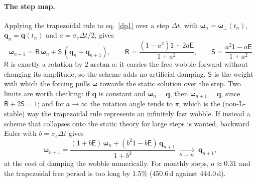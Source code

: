 \documentclass[11pt,a4paper]{article}
\newcommand{\bw}{\bm{\omega}}
\newcommand{\bq}{\mathbf{q}}
\newcommand{\E}{\mathsf{E}}
\newcommand{\Id}{\mathsf{1}}
\newcommand{\R}{\mathsf{R}}
\newcommand{\Sm}{\mathsf{S}}
\begin{document}
\paragraph{The step map.} Applying the trapezoidal rule to eq.~\eqref{dp1} over a step $\Delta t$,
with $\bw_n=\bw_\perp(t_n)$, $\bq_n=\bq(t_n)$ and $a=\sigma_e\Delta t/2$, gives
\begin{equation}
  \boxed{\;\bw_{n+1}=\R\,\bw_n+\Sm\,(\bq_n+\bq_{n+1}),\qquad
  \R=\frac{(1-a^2)\Id+2a\E}{1+a^2},\qquad \Sm=\frac{a^2\Id-a\E}{1+a^2}\;}
  \tag{DP8}\label{dp8}
\end{equation}
$\R$ is exactly a rotation by $2\arctan a$: it carries the free wobble forward without changing its
amplitude, so the scheme adds no artificial damping. $\Sm$ is the weight with which the forcing
pulls $\bw$ towards the static solution over the step. Two limits are worth checking:
if $\bq$ is constant and $\bw_n=\bq$, then $\bw_{n+1}=\bq$, since $\R+2\Sm=\Id$; and for
$a\to\infty$ the rotation angle tends to $\pi$, which is the (non-L-stable) way the trapezoidal rule
represents an infinitely fast wobble. If instead a scheme that collapses onto the static theory for
large steps is wanted, backward Euler with $b=\sigma_e\Delta t$ gives
\begin{equation}
  \bw_{n+1}=\frac{(\Id+b\E)\,\bw_n+(b^2\Id-b\E)\,\bq_{n+1}}{1+b^2}\;\xrightarrow[b\to\infty]{}\;\bq_{n+1},
  \tag{DP9}\label{dp9}
\end{equation}
at the cost of damping the wobble numerically. For monthly steps, $a\approx0.31$ and the trapezoidal
free period is too long by 1.5\% (450.6\,d against 444.0\,d).
\end{document}
